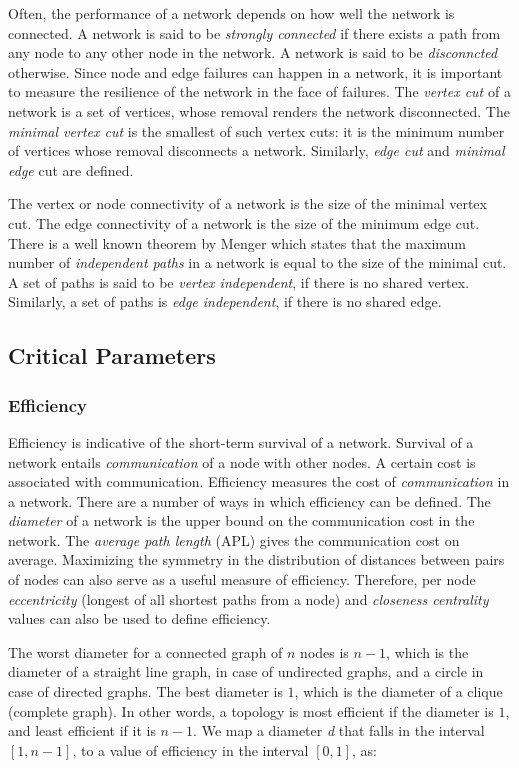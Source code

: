 \documentclass[a4paper,10pt]{article}
\begin{document}
Often, the performance of a network depends on how well the network is connected. A network is said to be \textit{strongly connected} if there exists a path from any node to any other node in the network. A network is said to be \textit{disconncted} otherwise. Since node and edge failures can happen in a network, it is important to measure the resilience of the network in the face of failures. The \textit{vertex cut} of a network is a set of vertices, whose removal renders the network disconnected. The \textit{minimal vertex cut} is the smallest of such vertex cuts: it is the minimum number of vertices whose removal disconnects a network. Similarly, \textit{edge cut} and \textit{minimal edge} cut are defined.

The vertex or node connectivity of a network is the size of the minimal vertex cut. The edge connectivity of a network is the size of the minimum edge cut. There is a well known theorem by Menger which states that the maximum number of \textit{independent paths} in a network is equal to the size of the minimal cut. A set of paths is said to be \textit{vertex independent}, if there is no shared vertex. Similarly, a set of paths is \textit{edge independent}, if there is no shared edge. 

\subsection{Critical Parameters}

\subsubsection{Efficiency}
Efficiency is indicative of the short-term survival of a network. Survival of a network entails \textit{communication} of a node with other nodes. A certain cost is associated with communication. Efficiency measures the cost of \textit{communication} in a network. There are a number of ways in which efficiency can be defined. The \textit{diameter} of a network is the upper bound on the communication cost in the network. The \textit{average path length} (APL) gives the communication cost on average. Maximizing the symmetry in the distribution of distances between pairs of nodes can also serve as a useful measure of efficiency. Therefore, per node \textit{eccentricity} (longest of all shortest paths from a node) and \textit{closeness centrality} values can also be used to define efficiency.

The worst diameter for a connected graph of $n$ nodes is $n - 1$, which is the diameter of a straight line graph, in case of undirected graphs, and a circle in case of directed graphs. The best diameter is $1$, which is the diameter of a clique (complete graph). In other words, a topology is most efficient if the diameter is $1$, and least efficient if it is  $n - 1$. We map a diameter \textit{d} that falls in the interval $\left[1, n - 1\right]$, to a value of efficiency in the interval $\left[0, 1\right]$, as:
\end{document}
